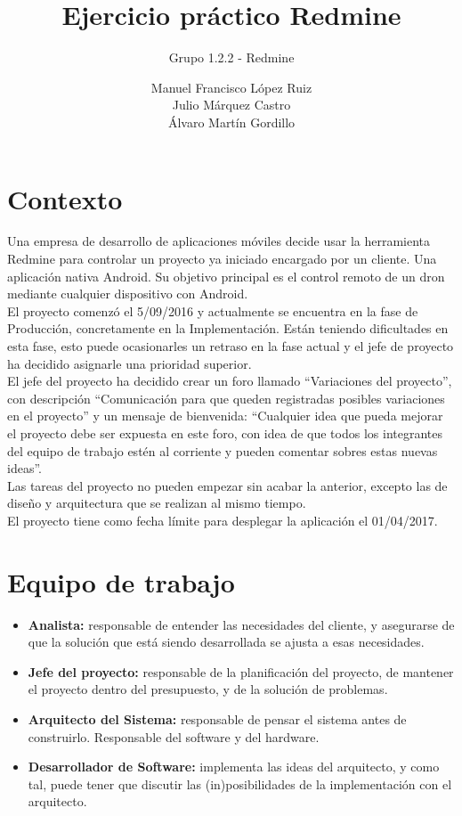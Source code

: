 \documentclass[a4paper,10pt]{scrartcl}
\title{Ejercicio práctico Redmine}
\subtitle{Grupo 1.2.2 - Redmine}
\author{
		Manuel Francisco López Ruiz\\
		Julio Márquez Castro\\
		Álvaro Martín Gordillo\\
		  }
\begin{document}
\clearpage\maketitle
\thispagestyle{empty}
\newpage

\newpage

\tableofcontents

\newpage

\section{Contexto}

Una empresa de desarrollo de aplicaciones móviles decide usar la herramienta Redmine para controlar un proyecto ya iniciado encargado por un cliente. Una aplicación nativa Android. Su objetivo principal es el control remoto de un dron mediante cualquier dispositivo con Android.\\

El proyecto comenzó el 5/09/2016 y actualmente se encuentra en la fase de Producción, concretamente en la Implementación. Están teniendo dificultades en esta fase, esto puede ocasionarles un retraso en la fase actual y el jefe de proyecto ha decidido asignarle una prioridad superior.\\

El jefe del proyecto ha decidido crear un foro llamado “Variaciones del proyecto”, con descripción “Comunicación para que queden registradas posibles variaciones en el proyecto” y un mensaje de bienvenida: “Cualquier idea que pueda mejorar el proyecto debe ser expuesta en este foro, con idea de que todos los integrantes del equipo de trabajo estén al corriente y pueden comentar sobres estas nuevas ideas”.\\

Las tareas del proyecto no pueden empezar sin acabar la anterior, excepto las de diseño y arquitectura que se realizan al mismo tiempo.\\

El proyecto tiene como fecha límite para desplegar la aplicación el 01/04/2017. 


\section{Equipo de trabajo}


\begin{itemize}{}{}
	\item \textbf{Analista:} responsable de entender las necesidades del cliente, y asegurarse de que la solución que está siendo desarrollada se ajusta a esas necesidades.
	\item \textbf{Jefe del proyecto:} responsable de la planificación del proyecto, de mantener el proyecto dentro del presupuesto, y de la solución de problemas.
	\item \textbf{Arquitecto del Sistema:} responsable de pensar el sistema antes de construirlo. Responsable del software y del hardware.
	\item \textbf{Desarrollador de Software:} implementa las ideas del arquitecto, y como tal, puede tener que discutir las (in)posibilidades de la implementación con el arquitecto.
\end{itemize}
\end{document}
